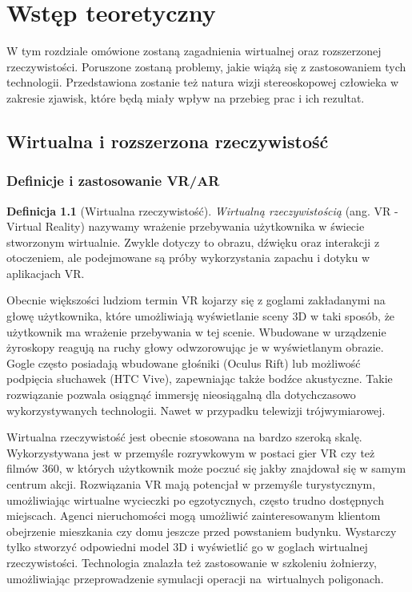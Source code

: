 \documentclass[a4paper,11pt,twoside]{report}
\theoremstyle{definition}
\newtheorem{definition}[theorem]{Definicja}
\begin{document}
\chapter{Wstęp teoretyczny}

W tym rozdziale omówione zostaną zagadnienia wirtualnej oraz rozszerzonej rzeczywistości. Poruszone zostaną problemy, jakie wiążą się z zastosowaniem tych technologii. Przedstawiona zostanie też natura wizji stereoskopowej człowieka w zakresie zjawisk, które będą miały wpływ na przebieg prac i ich rezultat.

\section {Wirtualna i rozszerzona rzeczywistość}

\subsection {Definicje i zastosowanie VR/AR}

\begin{definition}[Wirtualna rzeczywistość]
\textit{Wirtualną rzeczywistością} (ang. VR - Virtual Reality) nazywamy wrażenie przebywania użytkownika w świecie stworzonym wirtualnie. Zwykle dotyczy to obrazu, dźwięku oraz interakcji z otoczeniem, ale podejmowane są próby wykorzystania zapachu i dotyku w aplikacjach VR.
\end{definition}

Obecnie większości ludziom termin VR kojarzy się z goglami zakładanymi na głowę użytkownika, które umożliwiają wyświetlanie sceny 3D w taki sposób, że użytkownik ma wrażenie przebywania w tej scenie. Wbudowane w urządzenie żyroskopy reagują na ruchy głowy odwzorowując je w wyświetlanym obrazie. Gogle często posiadają wbudowane głośniki (Oculus Rift) lub możliwość podpięcia słuchawek (HTC Vive), zapewniając także bodźce akustyczne. Takie rozwiązanie pozwala osiągnąć immersję nieosiągalną dla dotychczasowo wykorzystywanych technologii. Nawet w przypadku telewizji trójwymiarowej.

Wirtualna rzeczywistość jest obecnie stosowana na bardzo szeroką skalę. Wykorzystywana jest w przemyśle rozrywkowym w postaci gier VR czy też filmów 360\textdegree, w których użytkownik może poczuć się jakby znajdował się w samym centrum akcji. Rozwiązania VR mają potencjał w przemyśle turystycznym, umożliwiając wirtualne wycieczki po egzotycznych, często trudno dostępnych miejscach. Agenci nieruchomości mogą umożliwić zainteresowanym klientom obejrzenie mieszkania czy domu jeszcze przed powstaniem budynku. Wystarczy tylko stworzyć odpowiedni model 3D i wyświetlić go w goglach wirtualnej rzeczywistości. Technologia znalazła też zastosowanie w szkoleniu żołnierzy, umożliwiając przeprowadzenie symulacji operacji na~wirtualnych poligonach.
\end{document}
